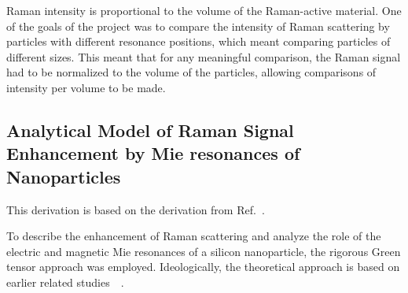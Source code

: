                 Raman intensity is proportional to the volume of the Raman-active material. One of the goals of the project was to compare
            the intensity of Raman scattering by particles with different resonance positions, which meant comparing particles of different
            sizes. This meant that for any meaningful comparison, the Raman signal had to be normalized to the volume of the particles, allowing
            comparisons of intensity per volume to be made.

    \subsection{Analytical Model of Raman Signal Enhancement by Mie resonances of Nanoparticles}
        \label{sec:Theory}
            This derivation is based on the derivation from Ref.~.

            To describe the enhancement of Raman scattering and analyze the role of the electric and magnetic
        Mie resonances of a silicon nanoparticle, the rigorous Green tensor approach was employed. Ideologically,
        the theoretical approach is based on earlier related studies~~\cite{canccado2014theory, murphy1983enhanced}.

